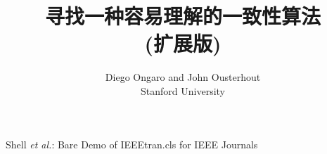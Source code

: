 \documentclass[journal]{IEEEtran}
\begin{document}
%
\title{寻找一种容易理解的一致性算法\\(扩展版)}
%
%
%

\author{Diego Ongaro and John Ousterhout \\ Stanford University}

% 
%



 {Shell \MakeLowercase{\textit{et al.}}: Bare Demo of IEEEtran.cls for IEEE Journals}
% 
\end{document}
